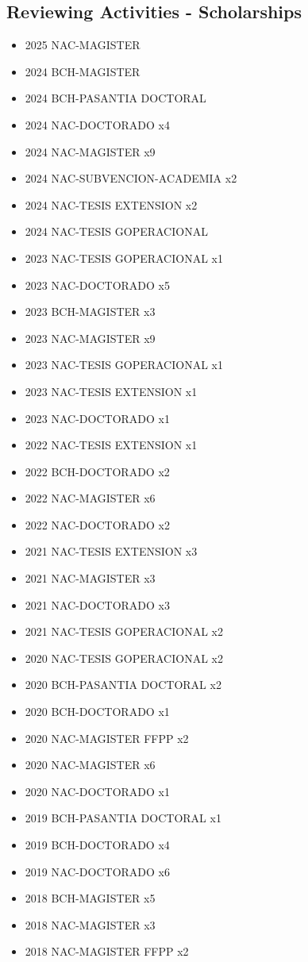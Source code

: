 \subsection{Reviewing Activities - Scholarships}

{\begin{itemize}
\item 2025 NAC-MAGISTER
\item 2024 BCH-MAGISTER
\item 2024 BCH-PASANTIA DOCTORAL
\item 2024 NAC-DOCTORADO x4
\item 2024 NAC-MAGISTER x9
\item 2024 NAC-SUBVENCION-ACADEMIA x2
\item 2024 NAC-TESIS EXTENSION x2
\item 2024 NAC-TESIS GOPERACIONAL
\item 2023 NAC-TESIS GOPERACIONAL x1
\item 2023 NAC-DOCTORADO x5
\item 2023 BCH-MAGISTER x3
\item 2023 NAC-MAGISTER x9
\item 2023 NAC-TESIS GOPERACIONAL x1
\item 2023 NAC-TESIS EXTENSION x1
\item 2023 NAC-DOCTORADO x1
\item 2022 NAC-TESIS EXTENSION x1
\item 2022 BCH-DOCTORADO x2
\item 2022 NAC-MAGISTER x6
\item 2022 NAC-DOCTORADO x2
\item 2021 NAC-TESIS EXTENSION x3
\item 2021 NAC-MAGISTER x3
\item 2021 NAC-DOCTORADO x3
\item 2021 NAC-TESIS GOPERACIONAL x2
\item 2020 NAC-TESIS GOPERACIONAL x2
\item 2020 BCH-PASANTIA DOCTORAL x2
\item 2020 BCH-DOCTORADO x1
\item 2020 NAC-MAGISTER FFPP x2
\item 2020 NAC-MAGISTER x6
\item 2020 NAC-DOCTORADO x1
\item 2019 BCH-PASANTIA DOCTORAL x1
\item 2019 BCH-DOCTORADO x4
\item 2019 NAC-DOCTORADO x6
\item 2018 BCH-MAGISTER x5
\item 2018 NAC-MAGISTER x3
\item 2018 NAC-MAGISTER FFPP x2
\end{itemize}
}

